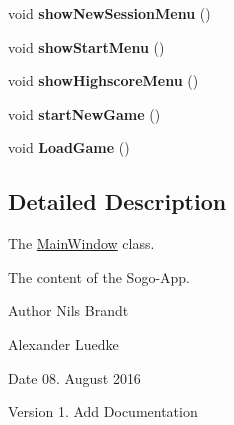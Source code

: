 \begin{DoxyCompactItemize}
\item 
\hypertarget{classMainWindow_ac63b1d94f5cb0ad40b6ce651c8786b18}{void {\bfseries show\-New\-Session\-Menu} ()}\label{classMainWindow_ac63b1d94f5cb0ad40b6ce651c8786b18}

\item 
\hypertarget{classMainWindow_a63f8a7b5189797e75f175da1949a1e76}{void {\bfseries show\-Start\-Menu} ()}\label{classMainWindow_a63f8a7b5189797e75f175da1949a1e76}

\item 
\hypertarget{classMainWindow_a7d14a8a706385f2596c38b3e7c8d8fb0}{void {\bfseries show\-Highscore\-Menu} ()}\label{classMainWindow_a7d14a8a706385f2596c38b3e7c8d8fb0}

\item 
\hypertarget{classMainWindow_a4195422fe1346c1aa9c640715dfe73cb}{void {\bfseries start\-New\-Game} ()}\label{classMainWindow_a4195422fe1346c1aa9c640715dfe73cb}

\item 
\hypertarget{classMainWindow_a7ca40808cd62d85f119fdf8b3b3d4b5d}{void {\bfseries Load\-Game} ()}\label{classMainWindow_a7ca40808cd62d85f119fdf8b3b3d4b5d}

\end{DoxyCompactItemize}


\subsection{Detailed Description}
The \hyperlink{classMainWindow}{Main\-Window} class. 

The content of the Sogo-\/\-App.

\begin{DoxyAuthor}{Author}
Nils Brandt 

Alexander Luedke
\end{DoxyAuthor}
\begin{DoxyDate}{Date}
08. August 2016
\end{DoxyDate}
\begin{DoxyVersion}{Version}
1. Add Documentation 
\end{DoxyVersion}
